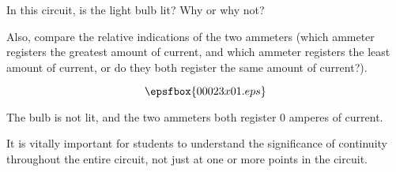 

In this circuit, is the light bulb lit?  Why or why not?

Also, compare the relative indications of the two ammeters (which ammeter registers the greatest amount of current, and which ammeter registers the least amount of current, or do they both register the same amount of current?).

$$\epsfbox{00023x01.eps}$$







The bulb is not lit, and the two ammeters both register 0 amperes of current.







It is vitally important for students to understand the significance of continuity throughout the entire circuit, not just at one or more points in the circuit.




